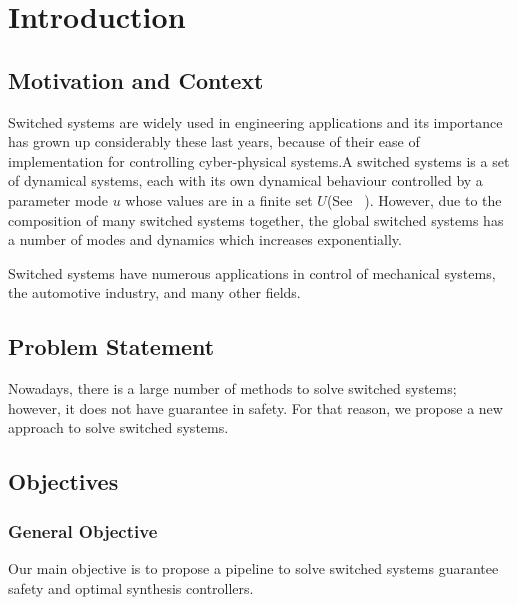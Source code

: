 \chapter{Introduction}
\label{ch:intro}



\section{Motivation and Context}
\label{sec:motivation}

Switched systems are widely used in engineering applications and its importance has grown up considerably these last years, because of their ease of implementation for controlling cyber-physical systems.A switched systems is a set of dynamical systems, each with its own dynamical behaviour controlled by a parameter mode $u$ whose values are in a finite set $U$(See ~\cite{liberzon2003switching}). However, due to the composition of many switched systems together, the global switched systems has a number of modes and dynamics which increases exponentially. 

Switched systems have numerous applications in control of mechanical systems, the automotive industry, and many other fields. 

\section{Problem Statement}
\label{sec:problem}
Nowadays, there is a large number of methods to solve switched systems; however, it does not have guarantee in safety. For that reason, we propose a new approach to solve switched systems. 
\section{Objectives}
\label{sec:objectives}

\subsection*{General Objective}
Our main objective is to propose a pipeline to solve switched systems guarantee safety and optimal synthesis controllers. 

